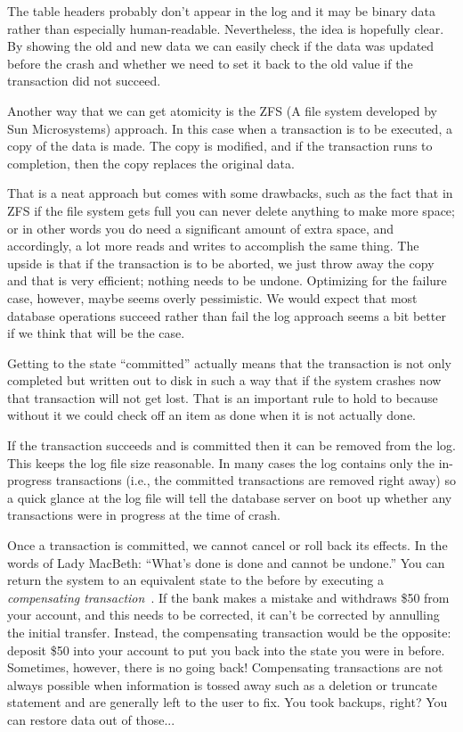 The table headers probably don't appear in the log and it may be binary data rather than especially human-readable. Nevertheless, the idea is hopefully clear. By showing the old and new data we can easily check if the data was updated before the crash and whether we need to set it back to the old value if the transaction did not succeed. 

Another way that we can get atomicity is the ZFS (A file system developed by Sun Microsystems) approach. In this case when a transaction is to be executed, a copy of the data is made. The copy is modified, and if the transaction runs to completion, then the copy replaces the original data. 

That is a neat approach but comes with some drawbacks, such as the fact that in ZFS if the file system gets full you can never delete anything to make more space; or in other words you do need a significant amount of extra space, and accordingly, a lot more reads and writes to accomplish the same thing. The upside is that if the transaction is to be aborted, we just throw away the copy and that is very efficient; nothing needs to be undone. Optimizing for the failure case, however, maybe seems overly pessimistic. We would expect that most database operations succeed rather than fail the log approach seems a bit better if we think that will be the case.

Getting to the state ``committed'' actually means that the transaction is not only completed but written out to disk in such a way that if the system crashes now that transaction will not get lost. That is an important rule to hold to because without it we could check off an item as done when it is not actually done.

If the transaction succeeds and is committed then it can be removed from the log. This keeps the log file size reasonable. In many cases the log contains only the in-progress transactions (i.e., the committed transactions are removed right away) so a quick glance at the log file will tell the database server on boot up whether any transactions were in progress at the time of crash.

Once a transaction is committed, we cannot cancel or roll back its effects. In the words of Lady MacBeth: ``What's done is done and cannot be undone.'' You can return the system to an equivalent state to the before by executing a \textit{compensating transaction}~\cite{dsc}. If the bank makes a mistake and withdraws \$50 from your account, and this needs to be corrected, it can't be corrected by annulling the initial transfer. Instead, the compensating transaction would be the opposite: deposit \$50 into your account to put you back into the state you were in before. Sometimes, however, there is no going back! Compensating transactions are not always possible when information is tossed away such as a deletion or truncate statement and are generally left to the user to fix. You took backups, right? You can restore data out of those... 

